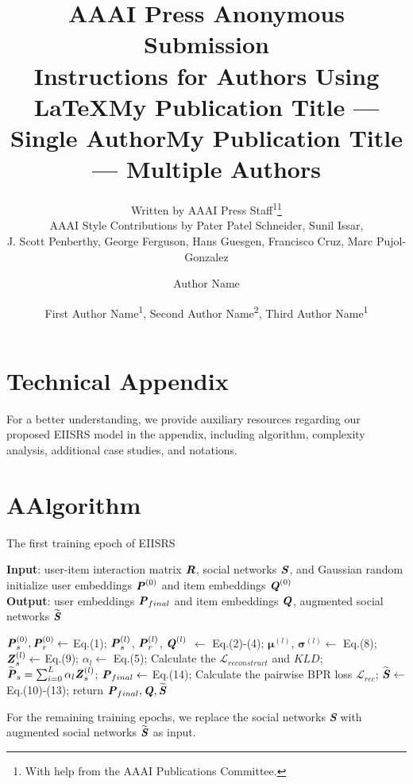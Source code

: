 \documentclass[letterpaper]{article} %
\title{AAAI Press Anonymous Submission\\Instructions for Authors Using \LaTeX{}}
\author{
    Written by AAAI Press Staff\textsuperscript{\rm 1}\thanks{With help from the AAAI Publications Committee.}\\
    AAAI Style Contributions by Pater Patel Schneider,
    Sunil Issar,\\
    J. Scott Penberthy,
    George Ferguson,
    Hans Guesgen,
    Francisco Cruz\equalcontrib,
    Marc Pujol-Gonzalez\equalcontrib
}
\title{My Publication Title --- Single Author}
\author {
    Author Name
}
\title{My Publication Title --- Multiple Authors}
\author {
    First Author Name\textsuperscript{\rm 1},
    Second Author Name\textsuperscript{\rm 2},
    Third Author Name\textsuperscript{\rm 1}
}
\begin{document}
\section{Technical Appendix}
For a better understanding, we provide auxiliary resources regarding our proposed EIISRS model in the appendix, including algorithm, complexity analysis, additional case studies, and notations.
\section{A{\quad}Algorithm}
\begin{algorithm}[h]
    \caption{The first training epoch of EIISRS}
    \label{alg:algorithm}
    \textbf{Input}: user-item interaction matrix $\textbf{\textit{R}}$, social networks $\textbf{\textit{S}}$, and Gaussian random initialize user embeddings $\textbf{\textit{P}}^{(0)}$ and item embeddings $\textbf{\textit{Q}}^{(0)}$\\
    \textbf{Output}: user embeddings $\textbf{\textit{P}}_{final}$ and item embeddings $\textbf{\textit{Q}}$, augmented social networks $\widetilde{\textbf{\textit{S}}}$
    \begin{algorithmic}[1]
                \State $\textbf{\textit{P}}^{(0)}_s, \textbf{\textit{P}}^{(0)}_r \gets$ Eq.(1); \textcolor{RoyalBlue}{\small{}}
                    \State $\textbf{\textit{P}}^{(l)}_s$, $\textbf{\textit{P}}^{(l)}_r$, $\textbf{\textit{Q}}^{(l)}$ $\gets$ Eq.(2)-(4);\textcolor{RoyalBlue}{\small{}}
                    \State $\boldsymbol{\mu}^{(l)}$, $\boldsymbol{\sigma}^{(l)} \gets$ Eq.(8);
                    \State $\textbf{\textit{Z}}_s^{(l)} \gets$ Eq.(9); \textcolor{RoyalBlue}{\small{}}
                    \State ${\alpha}_l \gets$ Eq.(5);
                    \State Calculate the $\mathcal{L}_{reconstruct}$ and $KLD$;
                \EndFor
                \State $\widetilde{\textbf{\textit{P}}}_s = \sum_{i=0}^{L}\alpha_l\textbf{\textit{Z}}_s^{(l)}$; \textcolor{RoyalBlue}{\small{}}
                \State $\textbf{\textit{P}}_{final} \gets$ Eq.(14);
                \State Calculate the pairwise BPR loss $\mathcal{L}_{rec}$;
            \EndFor
            \State $\widetilde{\textbf{\textit{S}}} \gets$ Eq.(10)-(13); \textcolor{RoyalBlue}{\small{}}
        \EndFor
        \State return $\textbf{\textit{P}}_{final}, \textbf{\textit{Q}}, \widetilde{\textbf{\textit{S}}}$
    \end{algorithmic}
\end{algorithm}
For the remaining training epochs, we replace the social networks \textbf{\textit{S}} with augmented social networks $\widetilde{\textbf{\textit{S}}}$ as input.
\end{document}
